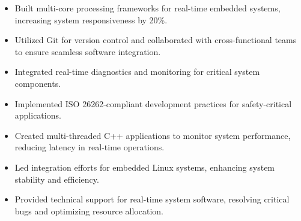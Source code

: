 \par\smallskip
\noindent
\begin{minipage}{20cm}
  \begin{minipage}{9.75cm}
    \begin{itemize}
      \item Built multi-core processing frameworks for real-time embedded systems, increasing system responsiveness by 20\%.
      \item Utilized Git for version control and collaborated with cross-functional teams to ensure seamless software integration.
    \end{itemize}
  \end{minipage}
  \hfill
  \begin{minipage}{9.75cm}
    \begin{itemize}
      \item Integrated real-time diagnostics and monitoring for critical system components.
      \item Implemented ISO 26262-compliant development practices for safety-critical applications.
    \end{itemize}
  \end{minipage}
\end{minipage}
\par\smallskip
\divider

\par\smallskip
\noindent
\begin{minipage}{20cm}
  \begin{minipage}{9.75cm}
    \begin{itemize}
      \item Created multi-threaded C++ applications to monitor system performance, reducing latency in real-time operations.
      \item Led integration efforts for embedded Linux systems, enhancing system stability and efficiency.
    \end{itemize}
  \end{minipage}
  \hfill
  \begin{minipage}{9.75cm}
    \begin{itemize}
      \item Provided technical support for real-time system software, resolving critical bugs and optimizing resource allocation.
    \end{itemize}
  \end{minipage}
\end{minipage}

